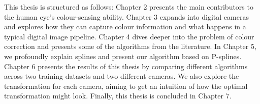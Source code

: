 This thesis is structured as follows: Chapter 2 presents the main contributors to the human eye's colour-sensing ability. Chapter 3 expands into digital cameras and explores how they can capture colour information and what happens in a typical digital image pipeline. Chapter 4 dives deeper into the problem of colour correction and presents some of the algorithms from the literature. In Chapter 5, we profoundly explain splines and present our algorithm based on P-splines. Chapter 6 
presents the results of this thesis by comparing different algorithms across two training datasets and two different cameras. We also explore the transformation for each camera, aiming to get an intuition of how the optimal transformation might look. Finally, this thesis is concluded in Chapter 7.





